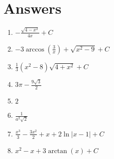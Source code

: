 \documentclass[12pt,letterpaper,fleqn]{article}
\newcommand{\ds}{\displaystyle}
\theoremstyle{definition}
\begin{document}
\section*{Answers}
\begin{enumerate}
  \item $\ds -\frac{\sqrt{4-x^2}}{4x} + C$
  \item $\ds - 3\arccos\left(\frac{3}{x}\right) + \sqrt{x^2-9}  + C$
  \item $\ds\frac{1}{3}(x^2-8)\sqrt{4+x^2} + C$
  \item $\ds 3\pi - \frac{9\sqrt{3}}{2}$
  \item $2$
  \item $\ds\frac{1}{a^2\sqrt{2}}$
  \item $\ds\frac{x^3}{3} - \frac{3x^2}{2} + x + 2\ln|x - 1| + C$
  \item $x^2 - x + 3\arctan(x) + C$
\end{enumerate}
\end{document}
